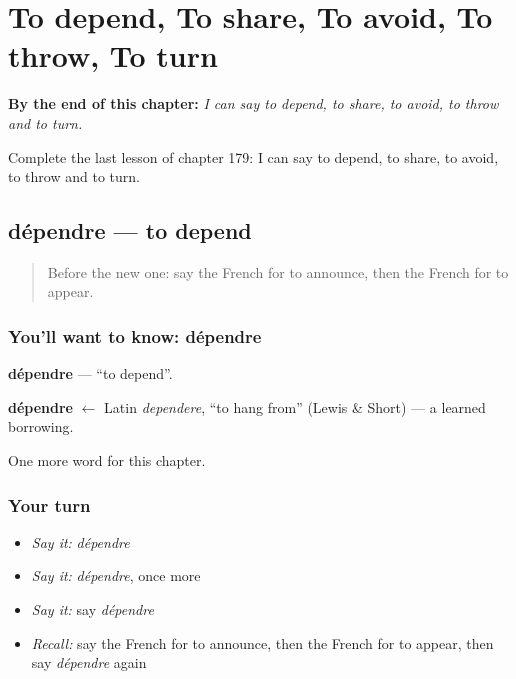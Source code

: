 
\chapter{To depend, To share, To avoid, To throw, To turn}
\label{ch:fr-to-depend-to-share-to-avoid-to-throw-to-turn}

\begin{chapteropening}
\textbf{By the end of this chapter:} \emph{I can say to depend, to share, to avoid, to throw and to turn.}

Complete the last lesson of chapter 179: I can say to depend, to share, to avoid, to throw and to turn.
\end{chapteropening}

\section[dépendre]{dépendre — to depend}

\label{lesson:FR-C179-dependre}



\begin{quote}
Before the new one: say the French for to announce, then the French for to appear.
\end{quote}

\subsection*{You'll want to know: dépendre}
\textbf{dépendre} — \textquotedblleft{}to depend\textquotedblright{}.

\begin{cousinweb}
\textbf{dépendre} $\leftarrow$ Latin \emph{dependere}, \textquotedblleft{}to hang from\textquotedblright{} (Lewis \& Short) — a learned borrowing.
\end{cousinweb}

\begin{grammarlens}[title={What you've built}]
One more word for this chapter.
\end{grammarlens}

\subsection*{Your turn}
\begin{itemize}
\raggedright
  \item \emph{Say it:} \emph{dépendre}
  \item \emph{Say it:} \emph{dépendre}, once more
  \item \emph{Say it:} say \emph{dépendre}
  \item \emph{Recall:} say the French for to announce, then the French for to appear, then say \emph{dépendre} again
\end{itemize}

